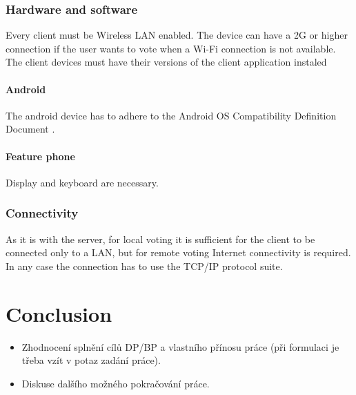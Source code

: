 \documentclass[11pt,twoside,a4paper]{book}
\begin{document}
\subsection{Hardware and software}
Every client must be Wireless LAN enabled. The device can have a 2G or higher connection if the user wants to vote when a Wi-Fi connection is not available. The client devices must have their versions of the client application instaled
\subsubsection{Android}
The android device has to adhere to the Android OS Compatibility Definition Document \cite{androCompatDef}.
\subsubsection{Feature phone}
Display and keyboard are necessary.
\subsection{Connectivity}
As it is with the server, for local voting it is sufficient for the client to be connected only to a LAN, but for remote voting Internet connectivity is required. In any case the connection has to use the TCP/IP protocol suite. 





\chapter{Conclusion}

\begin{itemize}
\item Zhodnocení splnění cílů DP/BP a  vlastního přínosu práce (při formulaci je třeba vzít v potaz zadání práce).
\item Diskuse dalšího možného pokračování práce.

\end{itemize} 	




{
\def\CS{$\cal C\kern-0.1667em\lower.5ex\hbox{$\cal S$}\kern-0.075em $}

}

%
\end{document}

